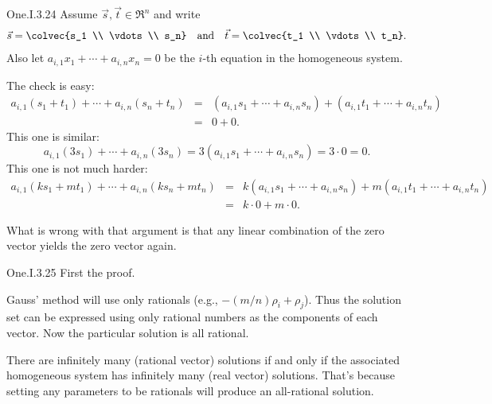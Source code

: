 \begin{ans}{One.I.3.24}
      Assume \( \vec{s},\vec{t}\in\Re^n \) and write
      \begin{equation*}
        \vec{s}=\colvec{s_1 \\ \vdots \\ s_n}
          \quad\mbox{and}\quad
        \vec{t}=\colvec{t_1 \\ \vdots \\ t_n}.
      \end{equation*}
      Also let \( a_{i,1}x_1+\cdots+a_{i,n}x_n=0 \) be the \( i \)-th equation
      in the homogeneous system.
      \begin{exparts}
        \partsitem The check is easy:
          \begin{eqnarray*}
            a_{i,1}(s_1+t_1)+\cdots+a_{i,n}(s_n+t_n)
            &=
            &(a_{i,1}s_1+\cdots+a_{i,n}s_n)
            +(a_{i,1}t_1+\cdots+a_{i,n}t_n)         \\
            &=
            &0+0.
          \end{eqnarray*}
        \partsitem This one is similar:
          \begin{equation*}
            a_{i,1}(3s_1)+\cdots+a_{i,n}(3s_n)
            =3(a_{i,1}s_1+\cdots+a_{i,n}s_n)
            =3\cdot 0=0.
          \end{equation*}
        \partsitem This one is not much harder:
          \begin{eqnarray*}
            a_{i,1}(ks_1+mt_1)+\cdots+a_{i,n}(ks_n+mt_n)
            &=
            &k(a_{i,1}s_1+\cdots+a_{i,n}s_n)
            +m(a_{i,1}t_1+\cdots+a_{i,n}t_n)         \\
            &=
            &k\cdot 0+m\cdot 0.
          \end{eqnarray*}
      \end{exparts}
     What is wrong with that argument is that any linear combination of the
     zero vector yields the zero vector again.
   
\end{ans}
\begin{ans}{One.I.3.25}
      First the proof.

      Gauss' method will use only rationals (e.g.,
      \( -(m/n)\rho_i+\rho_j \)).
      Thus the solution set can be expressed using only rational numbers as
      the components of each vector.
      Now the particular solution is all rational.

      There are infinitely many (rational vector) solutions if and only if the
      associated homogeneous system has infinitely many
      (real vector) solutions.
      That's because setting any parameters to be rationals will produce an
      all-rational solution.
   
\end{ans}

